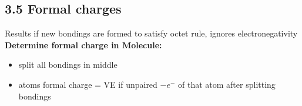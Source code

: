 \subsection{3.5 Formal charges}
    Results if new bondings are formed to satisfy octet rule, ignores electronegativity\\
    \textbf{Determine formal charge in Molecule:}
    \vspace*{-0.5em}
    \begin{itemize}
        \itemsep0em
        \item split all bondings in middle
        \item atoms formal charge = VE if unpaired $- e^-$ of that atom after splitting bondings
    \end{itemize}
